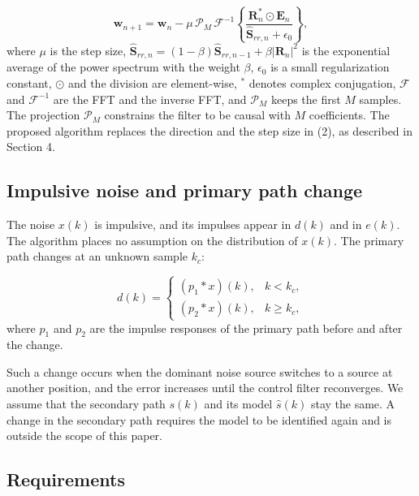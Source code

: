 \documentclass[sip,biber]{now-journal}
\begin{document}
\begin{equation}\label{eq:2}\mathbf{w}_{n+1} = \mathbf{w}_n - \mu\, \mathcal{P}_M\, \mathcal{F}^{-1}\!\left\{ \frac{\mathbf{R}_n^{*} \odot \mathbf{E}_n}{\hat{\mathbf{S}}_{rr,n} + \epsilon_0} \right\},\end{equation} where \(\mu\) is the step size, \(\hat{\mathbf{S}}_{rr,n} = (1-\beta)\hat{\mathbf{S}}_{rr,n-1} + \beta|\mathbf{R}_n|^2\) is the exponential average of the power spectrum with the weight \(\beta\), \(\epsilon_0\) is a small regularization constant, \(\odot\) and the division are element-wise, \({}^{*}\) denotes complex conjugation, \(\mathcal{F}\) and \(\mathcal{F}^{-1}\) are the FFT and the inverse FFT, and \(\mathcal{P}_M\) keeps the first \(M\) samples. The projection \(\mathcal{P}_M\) constrains the filter to be causal with \(M\) coefficients. The proposed algorithm replaces the direction and the step size in (2), as described in Section 4.

\hypertarget{sec:3.3}{%
\subsection{Impulsive noise and primary path change}\label{sec:3.3}}

The noise \(x(k)\) is impulsive, and its impulses appear in \(d(k)\) and in \(e(k)\). The algorithm places no assumption on the distribution of \(x(k)\). The primary path changes at an unknown sample \(k_c\):

\begin{equation}\label{eq:3}d(k) = \begin{cases} (p_1 * x)(k), & k < k_c, \\ (p_2 * x)(k), & k \ge k_c, \end{cases}\end{equation} where \(p_1\) and \(p_2\) are the impulse responses of the primary path before and after the change.

Such a change occurs when the dominant noise source switches to a source at another position, and the error increases until the control filter reconverges. We assume that the secondary path \(s(k)\) and its model \(\hat{s}(k)\) stay the same. A change in the secondary path requires the model to be identified again and is outside the scope of this paper.

\hypertarget{sec:3.4}{%
\subsection{Requirements}\label{sec:3.4}}
\end{document}
